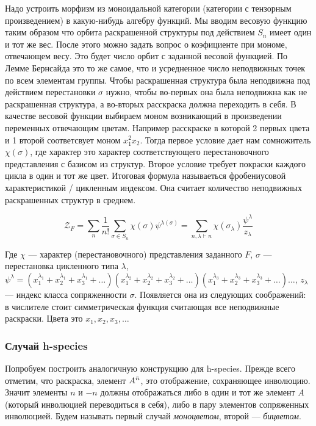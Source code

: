 Надо устроить морфизм из моноидальной
категории (категории с тензорным произведением) в какую-нибудь алгебру функций. Мы вводим весовую
функцию таким образом что орбита раскрашенной структуры под действием $S_n$ имеет один и тот же вес.
После этого можно задать вопрос о коэфициенте при мономе, отвечающем весу. Это
будет число орбит с заданной весовой функцией. По Лемме Бернсайда это то же
самое, что и усредненное число неподвижных точек по всем элементам группы. Чтобы
раскрашенная структура была неподвижна под действием перестановки $\sigma$
нужно, чтобы во-первых она была неподвижна как не раскрашенная структура, а
во-вторых расскраска должна переходить в себя. В качестве
весовой функции выбираем моном возникающий в произведении переменных отвечающим
цветам. Например расскраске в которой 2 первых цвета и 1 второй
соответсвует моном $x_1^2x_2$. Тогда первое условие дает нам сомножитель
$\chi(\sigma)$, где характер это характер соответствующего перестановочного
представления с базисом из структур. Второе условие требует покраски каждого
цикла в один и тот же цвет. Итоговая формула называеться фробениусовой
характеристикой / цикленным индексом. Она считает количество неподвижных
раскрашенных структур в среднем. 

\begin{equation}
\label{eq:fr}
\mathcal Z_F =
\sum_{n}\frac{1}{n!}\sum_{\sigma \in S_n}\chi(\sigma)\psi^{\lambda(\sigma)} =
\sum_{n, \lambda \vdash n}\chi(\sigma_{\lambda})
\frac{\psi^{\lambda}}{z_{\lambda}}
\end{equation}

Где $\chi$ --- характер (перестановочного) представления заданного $F$, $\sigma$
--- перестановка цикленного типа $\lambda$, 
$\psi^{\lambda} = 
(x_1^{\lambda_1} + x_2^{\lambda_1} + x_3^{\lambda_1} + \dots)
(x_1^{\lambda_2} + x_2^{\lambda_2} + x_3^{\lambda_2} + \dots)
(x_1^{\lambda_3} + x_2^{\lambda_3} + x_3^{\lambda_3} + \dots)
\dots$,
 $z_\lambda$ --- индекс класса сопряженности $\sigma$.
Появляется она из следующих соображений: в числителе стоит симметрическая
функция считающая все неподвижные раскраски. Цвета это $x_1, x_2, x_3, \dots$

\subsubsection{Случай h-species}
Попробуем построить аналогичную конструкцию для h-species.
Прежде всего отметим, что раскраска, элемент $A^{\Bar n}$, это отображение,
сохраняющее инволюцию. Значит элементы $n$ и $-n$ должны отображаться либо в
один и тот же элемент $A$ (который инволюцией переводиться в себя), либо в пару
элементов сопряженных инволюцией. Будем называть первый случай
\emph{моноцветом}, второй --- \emph{бицветом}.	


